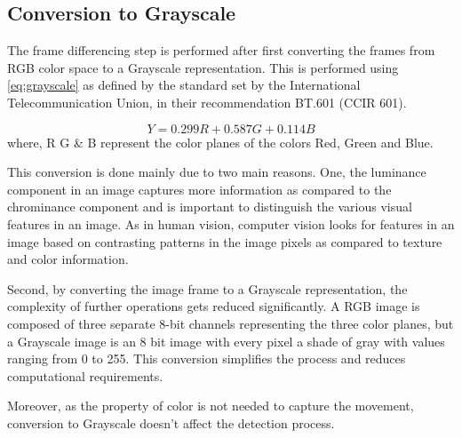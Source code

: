 \documentclass[a4paper]{article}
\begin{document}
\subsection{Conversion to Grayscale}
The frame differencing step is performed after first converting the frames from RGB color space to a Grayscale representation. This is performed using \autoref{eq:grayscale} as defined by the standard set by the International Telecommunication Union, in their recommendation BT.601 (CCIR 601).\par
\begin{equation} \label{eq:grayscale}
    Y = 0.299 R + 0.587 G + 0.114 B
\end{equation}
where, R G \& B represent the color planes of the colors Red, Green and Blue.\par
This conversion is done mainly due to two main reasons. One, the luminance component in an image captures more information as compared to  the chrominance component and is important to distinguish the various visual features in an image. As in human vision, computer vision looks for features in an image based on contrasting patterns in the image pixels as compared to texture and color information. \par 
Second, by converting the image frame to a Grayscale representation, the complexity of further operations gets reduced significantly. A RGB image is composed of three separate 8-bit channels representing the three color planes, but a Grayscale image is an 8 bit image with every pixel a shade of gray with values ranging from 0 to 255. This conversion simplifies the process and reduces computational requirements.\cite{kanan2012color}  \par  
Moreover, as the property of color is not needed to capture the movement, conversion to Grayscale doesn't affect the detection process.  
\end{document}
